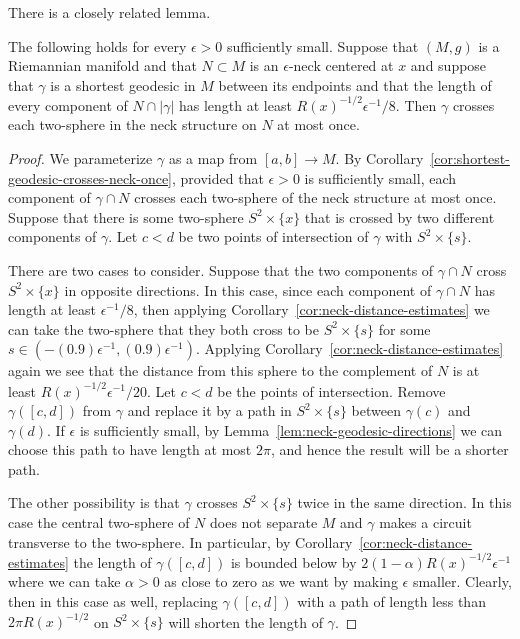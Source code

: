 There is a closely related lemma.

\begin{lemma}
\label{lem:geodesic-crosses-neck-once-general}
\label{genint}
The following holds for every $\epsilon>0$ sufficiently small.
Suppose that $(M,g)$ is a Riemannian manifold and that $N\subset M$
is an $\epsilon$-neck centered at $x$ and suppose that $\gamma$ is a
shortest geodesic in $M$ between its endpoints and that the length
of every component of $N\cap|\gamma|$ has length at least $
R(x)^{-1/2}\epsilon^{-1}/8$. Then $\gamma$ crosses each two-sphere
in the neck structure on $N$ at most once.
\end{lemma}


\begin{proof}
We parameterize $\gamma$ as a map from $[a,b]\to M$. By
Corollary~\ref{cor:shortest-geodesic-crosses-neck-once}, provided that $\epsilon>0$ is sufficiently
small, each component of $\gamma\cap N$ crosses each two-sphere of
the neck structure at most once. Suppose that there is some
two-sphere $S^2\times\{x\}$ that is crossed by two different
components of $\gamma$. Let $c<d$ be two points of intersection of
$\gamma$ with $S^2\times\{s\}$.

There are two cases to consider. Suppose that the two components of
$\gamma\cap N$ cross $S^2\times \{x\}$ in opposite directions. In
this case, since each component of $\gamma\cap N$ has length at
least $\epsilon^{-1}/8$, then applying Corollary~\ref{cor:neck-distance-estimates} we
can take the two-sphere that they both cross to be $S^2\times \{s\}$
for some $s\in (-(0.9)\epsilon^{-1},(0.9)\epsilon^{-1})$. Applying
Corollary~\ref{cor:neck-distance-estimates} again we see that the distance from this
sphere to the complement of $N$ is  at least
$R(x)^{-1/2}\epsilon^{-1}/20$. Let $c<d$ be the points of
intersection. Remove $\gamma([c,d])$ from $\gamma$ and replace it by
a path in $S^2\times\{s\}$ between $\gamma(c)$ and $\gamma(d)$. If
$\epsilon$ is sufficiently small, by Lemma~\ref{lem:neck-geodesic-directions} we can
choose this path to have length at most $2\pi$, and hence the result
will be a shorter path.

The other possibility is that $\gamma$ crosses $S^2\times\{s\}$
twice in the same direction. In this case the central two-sphere of
$N$ does not separate $M$ and $\gamma$ makes a circuit transverse to
the two-sphere. In particular, by Corollary~\ref{cor:neck-distance-estimates} the length
of $\gamma([c,d])$ is bounded below by
$2(1-\alpha)R(x)^{-1/2}\epsilon^{-1}$ where we can take $\alpha>0$
as close to zero as we want by making $\epsilon$ smaller. Clearly,
then in this case as well, replacing $\gamma([c,d])$ with a path of
length less than $2\pi R(x)^{-1/2}$ on $S^2\times\{s\}$ will shorten
the length of $\gamma$.
\end{proof}


